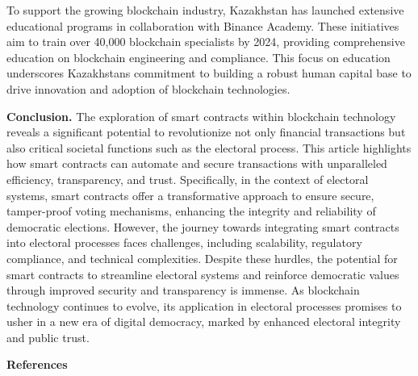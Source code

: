 \begin{multicols}{2}
To support the growing blockchain industry, Kazakhstan has launched
extensive educational programs in collaboration with Binance Academy.
These initiatives aim to train over 40,000 blockchain specialists by
2024, providing comprehensive education on blockchain engineering and
compliance. This focus on education underscores
Kazakhstan\textquotesingle s commitment to building a robust human
capital base to drive innovation and adoption of blockchain
technologies.

{\bfseries Conclusion.} The exploration of smart contracts within
blockchain technology reveals a significant potential to revolutionize
not only financial transactions but also critical societal functions
such as the electoral process. This article highlights how smart
contracts can automate and secure transactions with unparalleled
efficiency, transparency, and trust. Specifically, in the context of
electoral systems, smart contracts offer a transformative approach to
ensure secure, tamper-proof voting mechanisms, enhancing the integrity
and reliability of democratic elections. However, the journey towards
integrating smart contracts into electoral processes faces challenges,
including scalability, regulatory compliance, and technical
complexities. Despite these hurdles, the potential for smart contracts
to streamline electoral systems and reinforce democratic values through
improved security and transparency is immense. As blockchain technology
continues to evolve, its application in electoral processes promises to
usher in a new era of digital democracy, marked by enhanced electoral
integrity and public trust.
\end{multicols}

\begin{center}
{\bfseries References}
\end{center}

